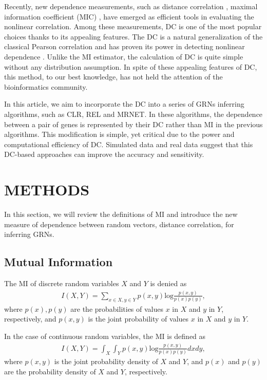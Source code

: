 \documentclass{bioinfo}
\begin{document}
Recently, new dependence measurements, such as distance correlation
\citep{szekely2007measuring}, maximal information coefficient (MIC)
\citep{reshef2011detecting}, have emerged as efficient tools in
evaluating the nonlinear correlation. Among these measurements, DC
is one of the most popular choices thanks to its appealing features.
The DC is a natural generalization of the classical Pearson
correlation and has proven its power in detecting nonlinear
dependence \citep{gorfine2012comment,szekely2007measuring}. Unlike
the MI estimator, the calculation of DC is quite simple without any
distribution assumption.  In spite of  these appealing features of
DC, this method, to our best knowledge, has not held the attention
of the bioinformatics community.

In this article, we aim to incorporate the DC into a series of GRNs inferring algorithms, such as CLR, REL and MRNET. In these algorithms, the dependence between a pair of genes is represented by their DC rather than MI in the previous algorithms. This modification is simple, yet critical due to the power and computational efficiency of DC. Simulated data and real data suggest that this DC-based approaches can improve the accuracy and sensitivity.

\section{METHODS}
In this section, we will review the definitions of MI and introduce
the new measure of dependence between random vectors, distance
correlation, for inferring GRNs.
\subsection{Mutual Information}
The MI of discrete random variables $X$ and $Y$ is denied as
\begin{align*}
    I(X,Y)=\sum_{x\in X,y\in Y} p(x,y)\mbox{log}\frac{p(x,y)}{p(x)p(y)},
\end{align*}
where $p(x),p(y)$ are the probabilities of values $x$ in $X$ and $y$
in $Y$, respectively, and $p(x,y)$ is the joint probability of
values $x$ in $X$ and $y$ in $Y$.

In the case of continuous random variables, the MI is defined as
\begin{align*}
    I(X,Y)=\int_X\int_Y p(x,y)\mbox{log}\frac{p(x,y)}{p(x)p(y)}dxdy,
\end{align*}
where $p(x,y)$ is the joint probability density of $X$ and $Y$, and $p(x)$ and $p(y)$ are the probability density of $X$ and $Y$, respectively.
\end{document}
